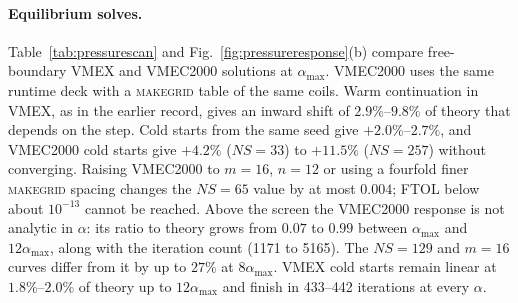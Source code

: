 \paragraph*{Equilibrium solves.}
Table~\ref{tab:pressurescan} and Fig.~\ref{fig:pressureresponse}(b) compare free-boundary VMEX and VMEC2000 solutions at $\alpha_{\max}$. VMEC2000 uses the same runtime deck with a \textsc{makegrid} table of the same coils. Warm continuation in VMEX, as in the earlier record, gives an inward shift of $2.9\%$--$9.8\%$ of theory that depends on the step. Cold starts from the same seed give $+2.0\%$--$2.7\%$, and VMEC2000 cold starts give $+4.2\%$ ($NS=33$) to $+11.5\%$ ($NS=257$) without converging. Raising VMEC2000 to $m=16$, $n=12$ or using a fourfold finer \textsc{makegrid} spacing changes the $NS=65$ value by at most $0.004$; FTOL below about $10^{-13}$ cannot be reached. Above the screen the VMEC2000 response is not analytic in $\alpha$: its ratio to theory grows from $0.07$ to $0.99$ between $\alpha_{\max}$ and $12\alpha_{\max}$, along with the iteration count (1171 to 5165). The $NS=129$ and $m=16$ curves differ from it by up to $27\%$ at $8\alpha_{\max}$. VMEX cold starts remain linear at $1.8\%$--$2.0\%$ of theory up to $12\alpha_{\max}$ and finish in 433--442 iterations at every $\alpha$.

